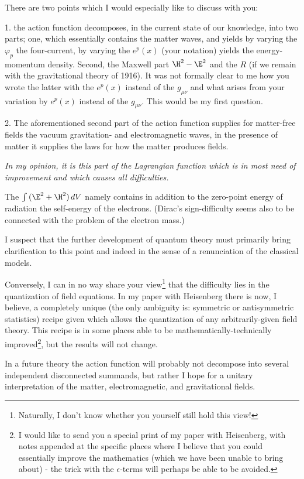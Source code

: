 \documentclass{article}
\begin{document}
There are two points which I would especially like to discuss with you:

1. the action function decomposes, in the current state of our knowledge, into two parts; one, which essentially contains the matter waves, and yields by varying the $\varphi_p$ the four-current, by varying the $e^p(x)$ (your notation) yields the energy-momentum density. Second, the Maxwell part $\H^2 - \E^2$ and the  $R$ (if we remain with the gravitational theory of 1916). It was not formally clear to me how you wrote the latter with the $e^p(x)$ instead of the $g_{\mu\nu}$ and what arises from your variation by $e^p(x)$ instead of the $g_{\mu\nu}$. This would be my first question.

2. The aforementioned second part of the action function supplies for matter-free fields the vacuum gravitation- and electromagnetic waves, in the presence of matter it supplies the laws for how the matter produces fields.

\textit{In my opinion, it is this part of the Lagrangian function which is in most need of improvement and which causes all difficulties.}

The $\int{(\E^2 + \H^2)}\,dV$ namely contains in addition to the zero-point energy of radiation the self-energy of the electrons. (Dirac's sign-difficulty seems also to be connected with the problem of the electron mass.)

I suspect that the further development of quantum theory must primarily bring clarification to this point and indeed in the sense of a renunciation of the classical models.

Conversely, I can in no way share your view\footnote{Naturally, I don't know whether you yourself still hold this view!} that the difficulty lies in the quantization of field equations. In my paper with Heisenberg there is now, I believe, a completely unique (the only ambiguity is: symmetric or antisymmetric statistics) recipe given which allows the quantization of any arbitrarily-given field theory. This recipe is in some places able to be mathematically-technically improved\footnote{I would like to send you a special print of my paper with Heisenberg, with notes appended at the specific places where I believe that you could essentially improve the mathematics (which we have been unable to bring about) - the trick with the $\epsilon$-terms will perhaps be able to be avoided.}, but the results will not change.

In a future theory the action function will probably not decompose into several independent disconnected summands, but rather I hope for a unitary interpretation of the matter, electromagnetic, and gravitational fields.
\end{document}
